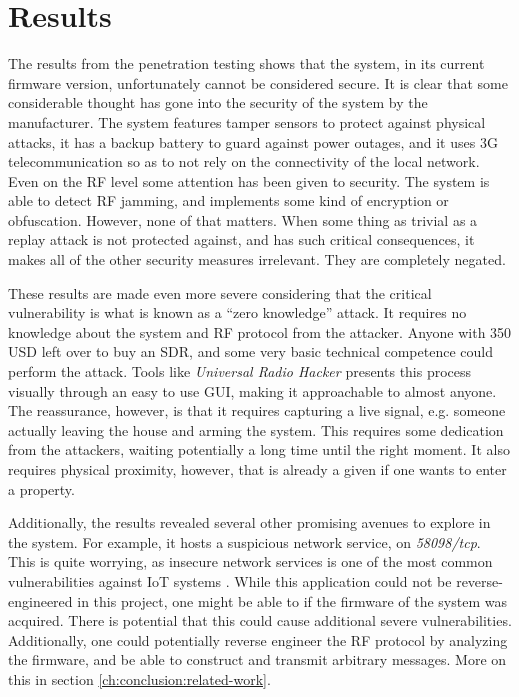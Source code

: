 \section{Results}
The results from the penetration testing shows that the system, in its current firmware version, unfortunately cannot be considered secure. It is clear that some considerable thought has gone into the security of the system by the manufacturer. The system features tamper sensors to protect against physical attacks, it has a backup battery to guard against power outages, and it uses 3G telecommunication so as to not rely on the connectivity of the local network. Even on the RF level some attention has been given to security. The system is able to detect RF jamming, and implements some kind of encryption or obfuscation. However, none of that matters. When some thing as trivial as a replay attack is not protected against, and has such critical consequences, it makes all of the other security measures irrelevant. They are completely negated.

These results are made even more severe considering that the critical vulnerability is what is known as a \enquote{zero knowledge} attack. It requires no knowledge about the system and RF protocol from the attacker. Anyone with 350 USD left over to buy an SDR, and some very basic technical competence could perform the attack. Tools like \textit{Universal Radio Hacker} \cite{urh} presents this process visually through an easy to use GUI, making it approachable to almost anyone. The reassurance, however, is that it requires capturing a live signal, e.g. someone actually leaving the house and arming the system. This requires some dedication from the attackers, waiting potentially a long time until the right moment. It also requires physical proximity, however, that is already a given if one wants to enter a property.

Additionally, the results revealed several other promising avenues to explore in the system. For example, it hosts a suspicious network service, on \textit{58098/tcp}. This is quite worrying, as insecure network services is one of the most common vulnerabilities against IoT systems \cite{owasp-iot-top10}. While this application could not be reverse-engineered in this project, one might be able to if the firmware of the system was acquired. There is potential that this could cause additional severe vulnerabilities. Additionally, one could potentially reverse engineer the RF protocol by analyzing the firmware, and be able to construct and transmit arbitrary messages. More on this in section \ref{ch:conclusion:related-work}.

